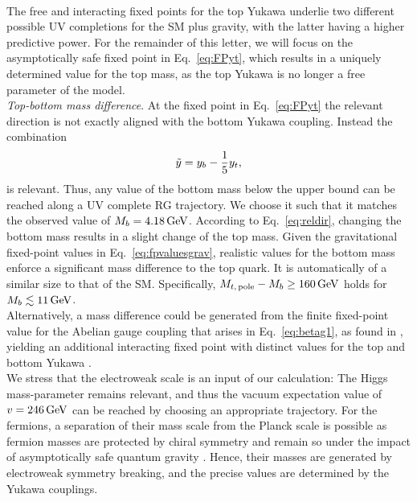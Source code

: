 \documentclass[%
 reprint,
 superscriptaddress,
preprintnumbers,
nofootinbib,
 amsmath,amssymb,
 aps,
prl,
]{revtex4-1}
\newcommand{\be}{\begin{equation}}
\newcommand{\ee}{\end{equation}}
\begin{document}
\\
The free and interacting fixed points for the top Yukawa 
underlie two different possible UV completions for the SM plus gravity, with the latter having a higher predictive power.
For the remainder of this letter, we will focus on the asymptotically safe fixed point in Eq.~\eqref{eq:FPyt}, which results in a uniquely determined value for the top mass, as the top Yukawa is no longer a free parameter of the model.
\\

\noindent\emph{Top-bottom mass difference}.
At the fixed point in Eq.~\eqref{eq:FPyt} the relevant direction is not exactly aligned with the bottom Yukawa coupling. Instead the combination
\vspace*{-2pt}
\be
\vspace*{-1pt}
\tilde{y} = y_b - \frac{1}{5}y_t,\label{eq:reldir}
\ee
is relevant.
 Thus, any value of the bottom mass below the upper bound can be reached along a UV complete RG trajectory.
We choose it such that it matches the observed value of $M_b=4.18\, \rm GeV$. According to Eq.~\eqref{eq:reldir}, changing the bottom mass results in a slight change of the top mass. Given the gravitational fixed-point values in Eq.~\ref{eq:fpvaluesgrav}, realistic values for the bottom mass enforce a significant mass difference to the top quark. It
is automatically of a similar size to that of the SM. Specifically, $M_{t,\,\rm pole }-M_b \geq 160\, \rm GeV$ holds for $M_b \lesssim 11\, \rm GeV$.\\
Alternatively, a mass difference could be generated from the finite fixed-point value for the Abelian gauge coupling that arises in Eq.~\eqref{eq:betag1}, as found in \cite{Harst:2011zx,Eichhorn:2017lry}, yielding an additional interacting fixed point with distinct values for the top and bottom Yukawa \cite{Held20175}.\\
We stress that the electroweak scale is an input of our calculation: The Higgs mass-parameter remains relevant, and thus the vacuum expectation value of $v = 246\, \rm GeV$ can be reached by choosing an appropriate trajectory. For the fermions, a separation of their mass scale from the Planck scale is possible as fermion masses are protected by chiral symmetry and remain so under the impact of asymptotically safe quantum gravity \cite{Eichhorn:2011pc,Eichhorn:2016vvy}. Hence, their masses are generated by electroweak symmetry breaking, and the precise values are determined by the Yukawa couplings.
\\
\end{document}
